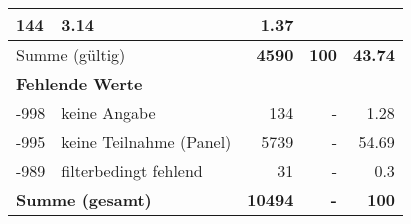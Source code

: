 \begin{longtable}{lXrrr}
       \num{144} &
       \num[round-mode=places,round-precision=2]{3,14} &
         \num[round-mode=places,round-precision=2]{1,37} \\
     \midrule
     \multicolumn{2}{l}{Summe (gültig)} &
       \textbf{\num{4590}} &
     \textbf{100} &
       \textbf{\num[round-mode=places,round-precision=2]{43,74}} \\
     \multicolumn{5}{l}{\textbf{Fehlende Werte}}\\
       -998 &
       keine Angabe &
         \num{134} &
        - &
         \num[round-mode=places,round-precision=2]{1,28} \\
       -995 &
       keine Teilnahme (Panel) &
         \num{5739} &
        - &
         \num[round-mode=places,round-precision=2]{54,69} \\
       -989 &
       filterbedingt fehlend &
         \num{31} &
        - &
         \num[round-mode=places,round-precision=2]{0,3} \\
     \midrule
     \multicolumn{2}{l}{\textbf{Summe (gesamt)}} &
          \textbf{\num{10494}} &
        \textbf{-} &
        \textbf{100} \\
     \bottomrule
     \end{longtable}
     
